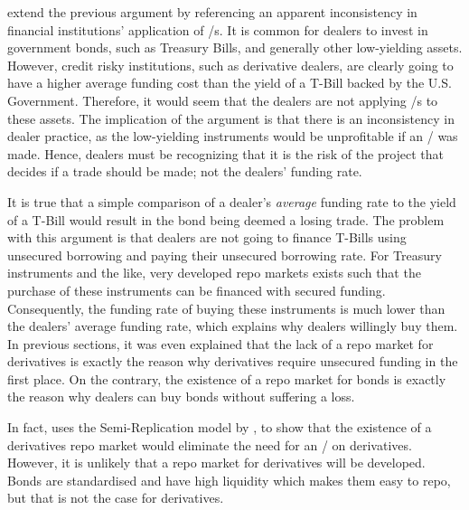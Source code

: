 \documentclass[main.tex]{subfiles}
\begin{document}
            \textcite{HullWhite2012FVA} extend the previous argument by referencing 
            an apparent inconsistency in financial institutions' application of \FVA/s.
            It is common for dealers to invest in government bonds, such as Treasury Bills,
            and generally other low-yielding assets.
            However, credit risky institutions, such as derivative dealers, are clearly going to have
            a higher average funding cost than the yield of a T-Bill backed by the U.S. Government.
            Therefore, it would seem that the dealers are not applying \FVA/s to these assets.
            The implication of the argument is that there is an inconsistency in dealer practice,
            as the low-yielding instruments would be unprofitable if an \FVA/ was made.
            Hence, dealers must be recognizing that it is 
            the risk of the project that decides if a trade should be made; 
            not the dealers' funding rate.

            It is true that a simple comparison of a dealer's \textit{average} funding rate
            to the yield of a T-Bill would result in the bond being deemed a losing trade.
            The problem with this argument is that dealers are not going to finance T-Bills
            using unsecured borrowing and paying their unsecured borrowing rate.
            For Treasury instruments and the like,
            very developed repo markets exists such that 
            the purchase of these instruments can be financed with secured funding.
            Consequently, the funding rate of buying these instruments is much lower 
            than the dealers' average funding rate,
            which explains why dealers willingly buy them.
            In previous sections, it was even explained that
            the lack of a repo market for derivatives is exactly the reason 
            why derivatives require unsecured funding in the first place.
            On the contrary, the existence of a repo market for bonds is exactly the reason
            why dealers can buy bonds without suffering a loss.

            In fact, \textcite{Green2015XVA}
            uses the Semi-Replication model by \textcite{BurgardKjaer2013Funding},
            to show that the existence of a derivatives repo market
            would eliminate the need for an \FVA/ on derivatives. 
            However, it is unlikely that a repo market for derivatives will be developed.
            Bonds are standardised and have high liquidity which makes them easy to repo,
            but that is not the case for derivatives.
\end{document}
